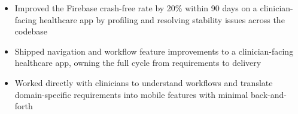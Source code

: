 \begin{itemize}
    \item Improved the Firebase crash-free rate by 20\% within 90 days on a clinician-facing healthcare app by profiling and resolving stability issues across the codebase
    \item Shipped navigation and workflow feature improvements to a clinician-facing healthcare app, owning the full cycle from requirements to delivery
    \item Worked directly with clinicians to understand workflows and translate domain-specific requirements into mobile features with minimal back-and-forth
\end{itemize}
